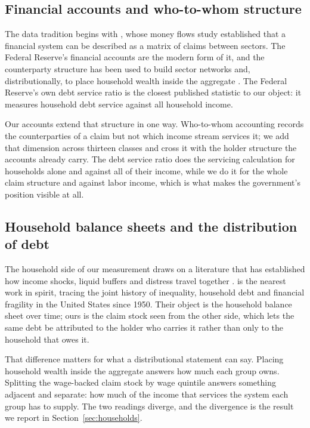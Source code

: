 \subsection{Financial accounts and who-to-whom structure}

The data tradition begins with \citet{Copeland1952}, whose money flows study established that a
financial system can be described as a matrix of claims between sectors. The Federal Reserve's
financial accounts \citep{FRBZ1} are the modern form of it, and the counterparty structure has
been used to build sector networks \citep{CastrenRancan2014} and, distributionally, to place
household wealth inside the aggregate \citep{BattyEtAl2019}. The Federal Reserve's own debt
service ratio is the closest published statistic to our object: it measures household debt
service against all household income.

Our accounts extend that structure in one way. Who-to-whom accounting records the counterparties
of a claim but not which income stream services it; we add that dimension across thirteen classes
and cross it with the holder structure the accounts already carry. The debt service ratio does
the servicing calculation for households alone and against all of their income, while we do it
for the whole claim structure and against labor income, which is what makes the government's
position visible at all.

\subsection{Household balance sheets and the distribution of debt}

The household side of our measurement draws on a literature that has established how income
shocks, liquid buffers and distress travel together
\citep{MianRaoSufi2013,GanongNoel2020,BhuttaBrickerDettlingKelliherLaufer2019,MerikullRoom2020}.
\citet{BartscherKuhnSchularickSteins2020} is the nearest work in spirit, tracing the joint
history of inequality, household debt and financial fragility in the United States since 1950.
Their object is the household balance sheet over time; ours is the claim stock seen from the
other side, which lets the same debt be attributed to the holder who carries it rather than only
to the household that owes it.

That difference matters for what a distributional statement can say. Placing household wealth
inside the aggregate \citep{BattyEtAl2019} answers how much each group owns. Splitting the
wage-backed claim stock by wage quintile answers something adjacent and separate: how much of the
income that services the system each group has to supply. The two readings diverge, and the
divergence is the result we report in Section~\ref{sec:households}.

